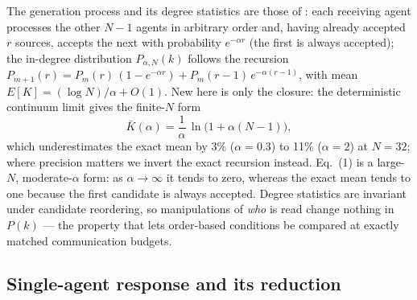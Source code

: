 \documentclass[11pt]{article}
\begin{document}
The generation process and its degree statistics are those of
\citet{SciRepCrowding}: each receiving agent processes the other $N-1$
agents in arbitrary order and, having already accepted $r$ sources, accepts
the next with probability $e^{-\alpha r}$ (the first is always accepted);
the in-degree distribution $P_{\alpha,N}(k)$ follows the recursion
$P_{m+1}(r) = P_m(r)\,(1-e^{-\alpha r}) + P_m(r-1)\,e^{-\alpha (r-1)}$,
with mean $E[K] = (\log N)/\alpha + O(1)$. New here is only the closure:
the deterministic continuum limit gives the finite-$N$ form
\begin{equation}
\bar K(\alpha) = \frac{1}{\alpha}\,\ln\!\bigl(1 + \alpha (N-1)\bigr),
\end{equation}
which underestimates the exact mean by 3\% ($\alpha = 0.3$) to 11\%
($\alpha = 2$) at $N = 32$; where precision matters we invert the exact
recursion instead. Eq.~(1) is a large-$N$, moderate-$\alpha$ form: as
$\alpha \to \infty$ it tends to zero, whereas the exact mean tends to one
because the first candidate is always accepted. Degree statistics are invariant under candidate reordering,
so manipulations of \emph{who} is read change nothing in $P(k)$ --- the
property that lets order-based conditions be compared at exactly matched
communication budgets.

\subsection{Single-agent response and its reduction}
\end{document}
